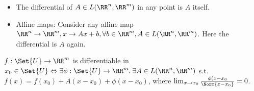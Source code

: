 \begin{exam}
 \begin{itemize}
  \item The differential of $A\in L(\RR^n,\RR^m)$ in any point is $A$ itself.
  \item Affine maps: Consider any affine map $\RR^n\to\RR^m, x\to A x+b, \forall b\in\RR^m, A\in L(\RR^n, \RR^m)$. Here the differential is $A$ again. 
 \end{itemize}
\end{exam}
\begin{prop}
 $f:\Set{U}\to\RR^m$ is differentiable in $x_0\in\Set{U}\Leftrightarrow \exists \phi:\Set{U}\to\RR^m.\:\exists A\in L(\RR^n, \RR^m)$ s.t. $f(x)=f(x_0)+A(x-x_0)+\phi(x-x_0)$, where $\lim_{x\to x_0}\frac{\phi(x-x_0}{\Norm{x-x_0}}=0$. 
\end{prop}